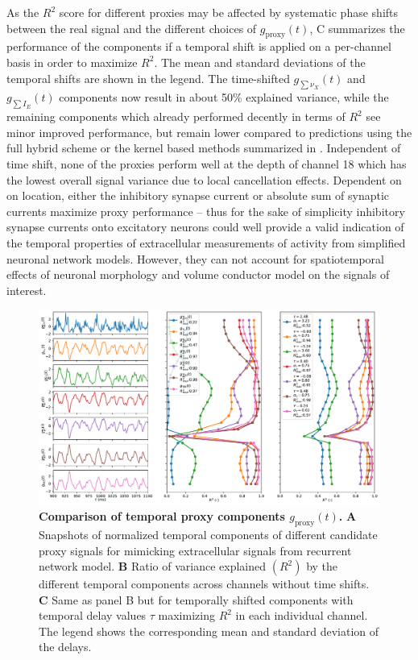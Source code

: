 As the $R^2$ score for different proxies may be affected by systematic phase shifts between the real signal and the different choices of $g_\mathrm{proxy}(t)$, 
C summarizes the performance of the components if a temporal shift is applied on a per-channel  basis in order to maximize $R^2$. 
The mean and standard deviations of the temporal shifts are shown in the legend. 
The time-shifted $g_{\sum \nu_X}(t)$ and $g_{\sum I_E}(t)$ components now result in about 50\% explained variance, 
while the remaining components which already performed decently in terms of $R^2$ see minor improved performance, 
but remain lower compared to predictions using the full hybrid scheme or the kernel based methods summarized in . 
Independent of time shift, none of the proxies perform well at the depth of channel 18 which has the lowest overall signal variance due to local cancellation effects.
Dependent on on location, 
either the inhibitory synapse current or absolute sum of synaptic currents maximize proxy performance 
-- thus for the sake of simplicity inhibitory synapse currents onto excitatory neurons could well provide a valid indication of the temporal properties of extracellular measurements of activity from simplified neuronal network models. 
However, they can not account for spatiotemporal effects of neuronal morphology and volume conductor model on the signals of interest. 


\begin{figure}[!ht]
\begin{center}
\includegraphics[width=\textwidth]{Figures/Ch-LFPy/Ch-LFPy-g_proxy.pdf}
\end{center}
\caption{\textbf{Comparison of temporal proxy components $g_\mathrm{proxy}(t)$.} 
{\bf A} Snapshots of normalized temporal components of different candidate proxy signals for mimicking extracellular signals from recurrent network model. 
{\bf B} Ratio of variance explained $(R^2)$ by the different temporal components across channels without time shifts. 
{\bf C} Same as panel B but for temporally shifted components with temporal delay values $\tau$ maximizing $R^2$ in each individual channel. 
The legend shows the corresponding mean and standard deviation of the delays.
}
\label{fig:g_proxy}
\end{figure}



